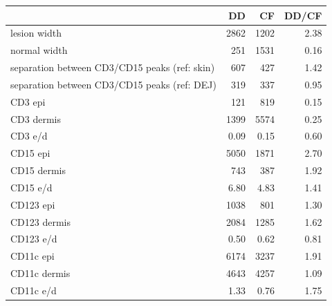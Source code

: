 \documentclass{article}
\begin{document}
\begin{tabular}{lrrr}
   \hline  &DD& CF& DD/CF\\ 
\hline
lesion width & 2862 & 1202 & 2.38 \\ 
  normal width & 251 & 1531 & 0.16 \\ 
  separation between CD3/CD15 peaks (ref: skin) & 607 & 427 & 1.42 \\ 
  separation between CD3/CD15 peaks (ref: DEJ) & 319 & 337 & 0.95 \\ 
   \hline
CD3 epi & 121 & 819 & 0.15 \\ 
  CD3 dermis & 1399 & 5574 & 0.25 \\ 
  CD3 e/d & 0.09 & 0.15 & 0.60 \\ 
   \hline
CD15 epi & 5050 & 1871 & 2.70 \\ 
  CD15 dermis & 743 & 387 & 1.92 \\ 
  CD15 e/d & 6.80 & 4.83 & 1.41 \\ 
   \hline
CD123 epi & 1038 & 801 & 1.30 \\ 
  CD123 dermis & 2084 & 1285 & 1.62 \\ 
  CD123 e/d & 0.50 & 0.62 & 0.81 \\ 
   \hline
CD11c epi & 6174 & 3237 & 1.91 \\ 
  CD11c dermis & 4643 & 4257 & 1.09 \\ 
  CD11c e/d & 1.33 & 0.76 & 1.75 \\ 
   \hline
\end{tabular}
\end{document}
